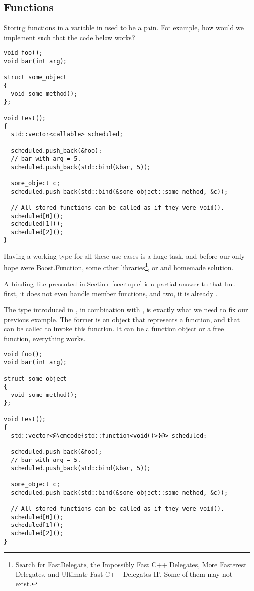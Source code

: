 \subsection{Functions}

Storing functions in a variable in \cpp{} used to be a pain. For
example, how would we implement  such that the code
below works?

\begin{lstlisting}
void foo();
void bar(int arg);

struct some_object
{
  void some_method();
};

void test();
{
  std::vector<callable> scheduled;

  scheduled.push_back(&foo);
  // bar with arg = 5.
  scheduled.push_back(std::bind(&bar, 5));

  some_object c;
  scheduled.push_back(std::bind(&some_object::some_method, &c));

  // All stored functions can be called as if they were void().
  scheduled[0]();
  scheduled[1]();
  scheduled[2]();
}
\end{lstlisting}

Having a working type for all these use cases is a huge task, and
before  our only hope were Boost.Function, some other
libraries\footnote{Search for FastDelegate, the Impossibly Fast C++
  Delegates, More Fasterest Delegates, and Ultimate Fast C++ Delegates
  II'. Some of them may not exist.}, or and homemade solution.

A binding like presented in Section~\ref{sec:tuple} is a partial
answer to that but first, it does not even handle member functions,
and two, it is already .

\bigskip

%
%
The  type introduced in , in combination
with  , is exactly what we
need to fix our previous example. The former is an object that represents a
function, and that can be called to invoke this function. It can be a
function object or a free function, everything works.

\begin{lstlisting}
void foo();
void bar(int arg);

struct some_object
{
  void some_method();
};

void test();
{
  std::vector<@\emcode{std::function<void()>}@> scheduled;

  scheduled.push_back(&foo);
  // bar with arg = 5.
  scheduled.push_back(std::bind(&bar, 5));

  some_object c;
  scheduled.push_back(std::bind(&some_object::some_method, &c));

  // All stored functions can be called as if they were void().
  scheduled[0]();
  scheduled[1]();
  scheduled[2]();
}
\end{lstlisting}

